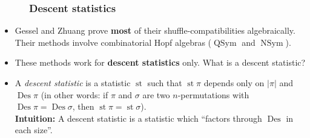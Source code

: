 \documentclass{beamer}
\newcommand{\Des}{\operatorname{Des}}
\newcommand{\st}{\operatorname{st}}
\newcommand{\QSym}{\operatorname{QSym}}
\newcommand{\NSym}{\operatorname{NSym}}
\newcommand{\fti}[1]{\frametitle{\ \ \ \ \ #1}}
\newcommand{\abs}[1]{\left| #1 \right|}
\newcommand{\defn}[1]{{\color{darkred}\emph{#1}}} %
\theoremstyle{plain}
\begin{document}
\begin{frame}
\fti{Descent statistics}

\begin{itemize}

\item Gessel and Zhuang prove \textbf{most} of their shuffle-compatibilities
      algebraically. Their methods involve combinatorial Hopf
      algebras ($\QSym$ and $\NSym$).

\item These methods work for \textbf{descent statistics} only.
      What is a descent statistic?

\pause

\item A \defn{descent statistic} is a statistic $\st$ such that
      $\st \pi$ depends only on $\abs{\pi}$ and $\Des\pi$
      (in other words: if $\pi$ and $\sigma$ are two
      $n$-permutations with $\Des\pi = \Des\sigma$, then
      $\st\pi = \st\sigma$). \\
      \textbf{Intuition:} A descent statistic is a statistic
      which ``factors through $\Des$ in each size''.

\end{itemize}
\end{frame}
\end{document}

